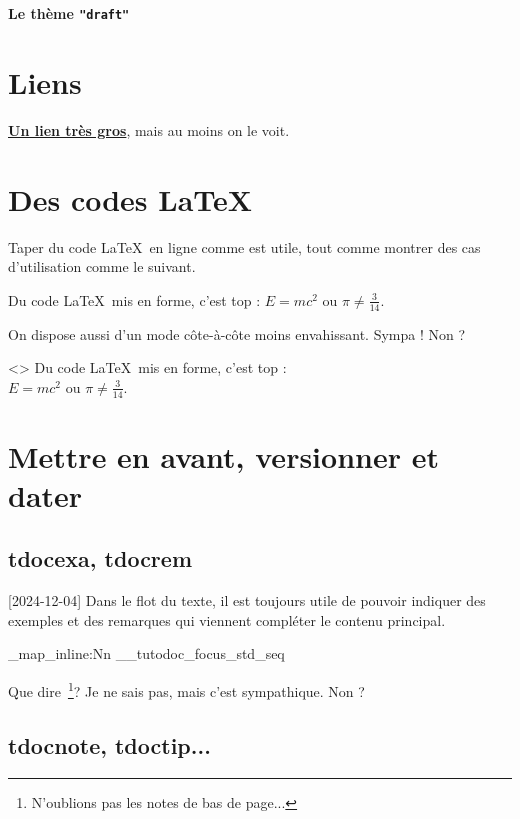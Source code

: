 \documentclass[theme = draft]{tutodoc}
\newcommand\thisstyle{draft}
\newcommand\myexrmktext{
    \tdocversion{1.7.0}[2024-12-04]
    Dans le flot du texte, il est toujours utile de pouvoir indiquer des exemples et des remarques qui viennent compléter le contenu principal.
}
\newcommand\myhighlightedtext{
    Que dire\,%
    \footnote{
        N'oublions pas les notes de bas de page...
    }?
    Je ne sais pas, mais c'est sympathique. Non ?
}
\begin{document}
\textsf{\Huge\bfseries Le thème \texttt{"\thisstyle"}}

\section{Liens}

{\Large\bfseries \href{https://github.com/bc-tools/for-latex/tree/main/tutodoc}{Un lien très gros}}, mais au moins on le voit.



\section{Des codes \LaTeX}

Taper du code \LaTeX\ en ligne comme  est utile, tout comme montrer des cas d'utilisation comme le suivant.

\begin{tdoclatex}
Du code \LaTeX\ mis en forme, c'est top : $E = m c^2$ ou $\pi \neq \frac{3}{14}$.
\end{tdoclatex}


On dispose aussi d'un mode côte-à-côte moins envahissant. Sympa ! Non ?

\begin{tdoclatex}<>
Du code \LaTeX\ mis en forme, c'est top : \\
$E = m c^2$ ou $\pi \neq \frac{3}{14}$.
\end{tdoclatex}



\section{Mettre en avant, versionner et dater}

\subsection{tdocexa, tdocrem}

\myexrmktext

\ExplSyntaxOn

\seq_map_inline:Nn \g__tutodoc_focus_std_seq {
    \begin{tdoc#1}
        \myhighlightedtext
    \end{tdoc#1}
}

\ExplSyntaxOff



\subsection{tdocnote, tdoctip...}
\end{document}
